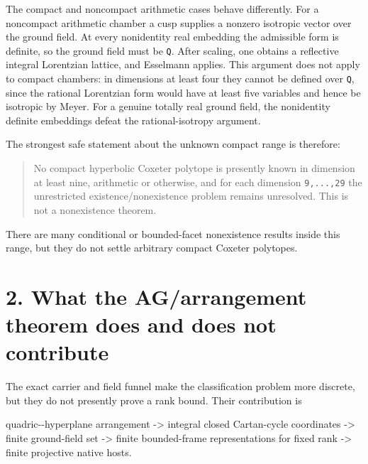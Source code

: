 \documentclass[
  10pt,
]{report}
\newenvironment{Shaded}{}{}
\newcommand{\NormalTok}[1]{#1}
\newcounter{none} %
\begin{document}
The compact and noncompact arithmetic cases behave differently. For a
noncompact arithmetic chamber a cusp supplies a nonzero isotropic vector
over the ground field. At every nonidentity real embedding the
admissible form is definite, so the ground field must be \texttt{Q}.
After scaling, one obtains a reflective integral Lorentzian lattice, and
Esselmann applies. This argument does not apply to compact chambers: in
dimensions at least four they cannot be defined over \texttt{Q}, since
the rational Lorentzian form would have at least five variables and
hence be isotropic by Meyer. For a genuine totally real ground field,
the nonidentity definite embeddings defeat the rational-isotropy
argument.

The strongest safe statement about the unknown compact range is
therefore:

\begin{quote}
No compact hyperbolic Coxeter polytope is presently known in dimension
at least nine, arithmetic or otherwise, and for each dimension
\texttt{9,...,29} the unrestricted existence/nonexistence problem
remains unresolved. This is not a nonexistence theorem.
\end{quote}

There are many conditional or bounded-facet nonexistence results inside
this range, but they do not settle arbitrary compact Coxeter polytopes.

\section{2. What the AG/arrangement theorem does and does not
contribute}\label{what-the-agarrangement-theorem-does-and-does-not-contribute}

The exact carrier and field funnel make the classification problem more
discrete, but they do not presently prove a rank bound. Their
contribution is

\begin{Shaded}
\begin{Highlighting}[]
\NormalTok{quadric{-}{-}hyperplane arrangement}
\NormalTok{      {-}\textgreater{} integral closed Cartan{-}cycle coordinates}
\NormalTok{      {-}\textgreater{} finite ground{-}field set}
\NormalTok{      {-}\textgreater{} finite bounded{-}frame representations for fixed rank}
\NormalTok{      {-}\textgreater{} finite projective native hosts.}
\end{Highlighting}
\end{Shaded}
\end{document}
